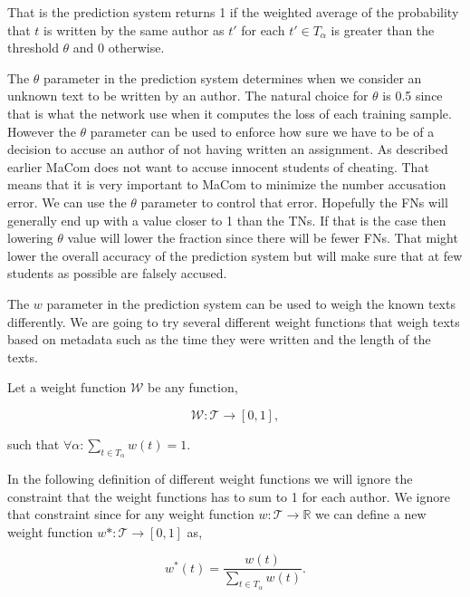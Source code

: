 That is the prediction system returns 1 if the weighted average of the
probability that $t$ is written by the same author as $t'$ for each $t' \in
T_\alpha$ is greater than the threshold $\theta$ and 0 otherwise.

The $\theta$ parameter in the prediction system determines when we consider
an unknown text to be written by an author. The natural choice for $\theta$
is 0.5 since that is what the network use when it computes the loss of each
training sample. However the $\theta$ parameter can be used to enforce how
sure we have to be of a decision to accuse an author of not having written
an assignment. As described earlier MaCom does not want to accuse innocent
students of cheating. That means that it is very important to MaCom to minimize
the number accusation error. We can use the $\theta$ parameter to control that
error. Hopefully the \gls{FN}s will generally end up with a value closer to 1
than the \gls{TN}s. If that is the case then lowering $\theta$ value will lower
the fraction since there will be fewer \gls{FN}s. That might lower the overall
accuracy of the prediction system but will make sure that at few students as
possible are falsely accused.

The $w$ parameter in the prediction system can be used to weigh the known texts
differently. We are going to try several different weight functions that weigh
texts based on metadata such as the time they were written and the length of
the texts.

\begin{definition}
    \label{def:weight_function}

    Let a weight function $\mathcal{W}$ be any function,

    \begin{equation}
        \mathcal{W} \colon \mathcal{T} \rightarrow [0, 1],
    \end{equation}

    such that $\forall \alpha \colon \sum_{t \in T_\alpha} w(t) = 1$.

\end{definition}

In the following definition of different weight functions we will ignore the
constraint that the weight functions has to sum to 1 for each author. We ignore
that constraint since for any weight function $w \colon \mathcal{T} \rightarrow
\mathbb{R}$ we can define a new weight function $w* \colon \mathcal{T}
\rightarrow [0, 1]$ as,

\begin{equation}\label{eq:normalize}
    w^*(t) = \frac{w(t)}{\sum_{t \in T_\alpha} w(t)}.
\end{equation}

